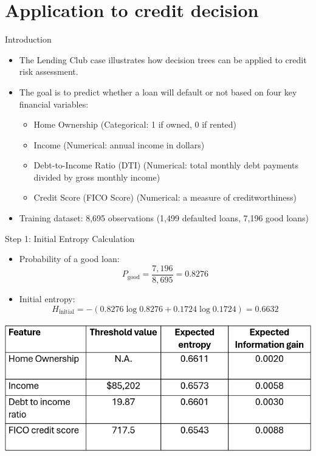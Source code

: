 \documentclass[11pt]{beamer}
\begin{document}
\section{Application to credit decision}
%
%
\begin{frame}{Introduction}
    \begin{itemize}
        \item The Lending Club case illustrates how decision trees can be applied to credit risk assessment.
        \item The goal is to predict whether a loan will default or not based on four key financial variables:
        \begin{itemize}
            \item Home Ownership (Categorical: 1 if owned, 0 if rented)
            \item Income (Numerical: annual income in dollars)
            \item Debt-to-Income Ratio (DTI) (Numerical: total monthly debt payments divided by gross monthly income)
            \item Credit Score (FICO Score) (Numerical: a measure of creditworthiness)
        \end{itemize}
        \item Training dataset: 8,695 observations (1,499 defaulted loans, 7,196 good loans)
    \end{itemize}
\end{frame}
%
%
\begin{frame}{Step 1: Initial Entropy Calculation}
    \begin{itemize}
        \item Probability of a good loan:
        \[ P_{\text{good}} = \frac{7,196}{8,695} = 0.8276 \]
        \item Initial entropy:
        \[ H_{\text{initial}} = - (0.8276 \log 0.8276 + 0.1724 \log 0.1724) = 0.6632 \]
    \end{itemize}
	\begin{center}
	\includegraphics[scale=.5]{../05-pictures/lesson-3-3_pic_4.png}
	\end{center}
\end{frame}
\end{document}
